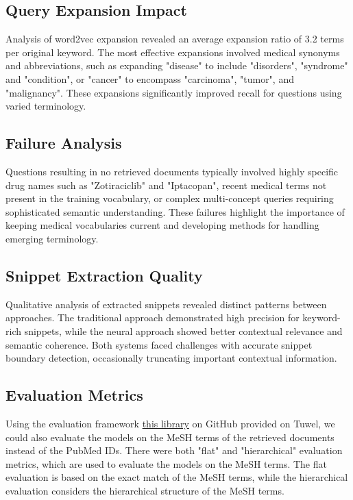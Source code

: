 \documentclass[12pt]{article}
\begin{document}
\subsection{Query Expansion Impact}

Analysis of word2vec expansion revealed an average expansion ratio of 3.2 terms per original keyword. The most effective expansions involved medical synonyms and abbreviations, such as expanding "disease" to include "disorders", "syndrome" and "condition", or "cancer" to encompass "carcinoma", "tumor", and "malignancy". These expansions significantly improved recall for questions using varied terminology.

\subsection{Failure Analysis}

Questions resulting in no retrieved documents typically involved highly specific drug names such as "Zotiraciclib" and "Iptacopan", recent medical terms not present in the training vocabulary, or complex multi-concept queries requiring sophisticated semantic understanding. These failures highlight the importance of keeping medical vocabularies current and developing methods for handling emerging terminology.

\subsection{Snippet Extraction Quality}

Qualitative analysis of extracted snippets revealed distinct patterns between approaches. The traditional approach demonstrated high precision for keyword-rich snippets, while the neural approach showed better contextual relevance and semantic coherence. Both systems faced challenges with accurate snippet boundary detection, occasionally truncating important contextual information.

\subsection{Evaluation Metrics}
Using the evaluation framework \href{https://github.com/BioASQ/Evaluation-Measures}{this library} on GitHub provided on Tuwel, we could also evaluate the models on the MeSH terms of the retrieved documents instead of the PubMed IDs. There were both "flat" and "hierarchical" evaluation metrics, which are used to evaluate the models on the MeSH terms. The flat evaluation is based on the exact match of the MeSH terms, while the hierarchical evaluation considers the hierarchical structure of the MeSH terms.
\end{document}
